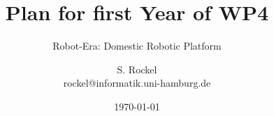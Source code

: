 




\title{Plan for first Year of WP4}


\subtitle{Robot-Era: Domestic Robotic Platform}


\author[S. Rockel]{S. Rockel\textbf{}\\
{\small rockel@informatik.uni-hamburg.de\vspace{-1em}
}}


\date{\today}

\makebeamertitle


